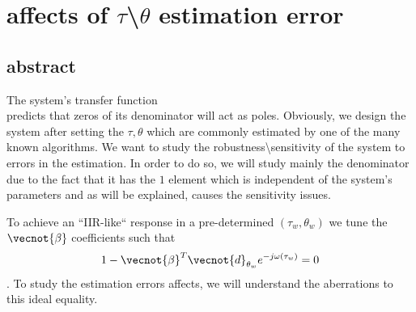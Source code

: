 \chapter{affects of $ \tau $\textbackslash$ \theta $ estimation error}
\label{apdx:MathDerv}
\section{abstract}
\par The system's transfer function
$$

$$
predicts that zeros of its denominator will act as poles. Obviously, we design the system after setting the $\tau, \theta$ which are commonly estimated by one of the many known algorithms. We want to study the robustness\textbackslash sensitivity of the system to errors in the estimation. In order to do so, we will study mainly the denominator due to the fact that it has the $ 1 $ element which is independent of the system's parameters and as will be explained, causes the sensitivity issues.

\par To achieve an ``IIR-like`` response in a pre-determined $(\tau_{w}, \theta_{w})$ we tune the $\vecnot{\beta}$ coefficients such that 
$$ 1-\vecnot{\beta}^{T}\vecnot{d}_{\theta_{w}}e^{-j\omega (\tau_{w})}=0 $$. To study the estimation errors affects, we will understand the aberrations to this ideal equality. 

